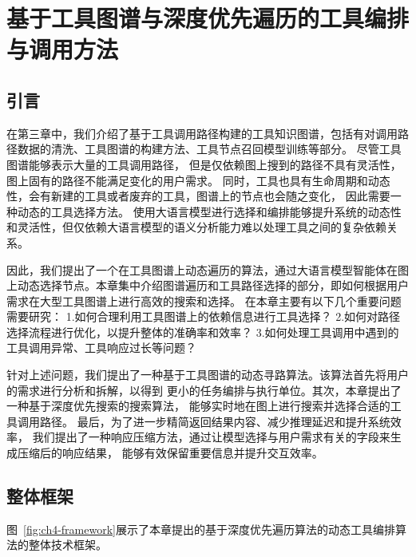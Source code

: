 \chapter{基于工具图谱与深度优先遍历的工具编排与调用方法}

\section{引言}
\label{sec:intro}

\indent 在第三章中，我们介绍了基于工具调用路径构建的工具知识图谱，包括有对调用路径数据的清洗、工具图谱的构建方法、工具节点召回模型训练等部分。
尽管工具图谱能够表示大量的工具调用路径，
但是仅依赖图上搜到的路径不具有灵活性，图上固有的路径不能满足变化的用户需求。
同时，工具也具有生命周期和动态性，会有新建的工具或者废弃的工具，图谱上的节点也会随之变化，
因此需要一种动态的工具选择方法。
使用大语言模型进行选择和编排能够提升系统的动态性和灵活性，但仅依赖大语言模型的语义分析能力难以处理工具之间的复杂依赖关系。

因此，我们提出了一个在工具图谱上动态遍历的算法，通过大语言模型智能体在图上动态选择节点。本章集中介绍图谱遍历和工具路径选择的部分，即如何根据用户需求在大型工具图谱上进行高效的搜索和选择。
在本章主要有以下几个重要问题需要研究：
1.如何合理利用工具图谱上的依赖信息进行工具选择？
2.如何对路径选择流程进行优化，以提升整体的准确率和效率？
3.如何处理工具调用中遇到的工具调用异常、工具响应过长等问题？

\indent 针对上述问题，我们提出了一种基于工具图谱的动态寻路算法。该算法首先将用户的需求进行分析和拆解，以得到
更小的任务编排与执行单位。其次，本章提出了一种基于深度优先搜索的搜索算法，
能够实时地在图上进行搜索并选择合适的工具调用路径。
最后，为了进一步精简返回结果内容、减少推理延迟和提升系统效率，
我们提出了一种响应压缩方法，通过让模型选择与用户需求有关的字段来生成压缩后的响应结果，
能够有效保留重要信息并提升交互效率。

\section{整体框架}

图~\ref{fig:ch4-framework}展示了本章提出的基于深度优先遍历算法的动态工具编排算法的整体技术框架。

